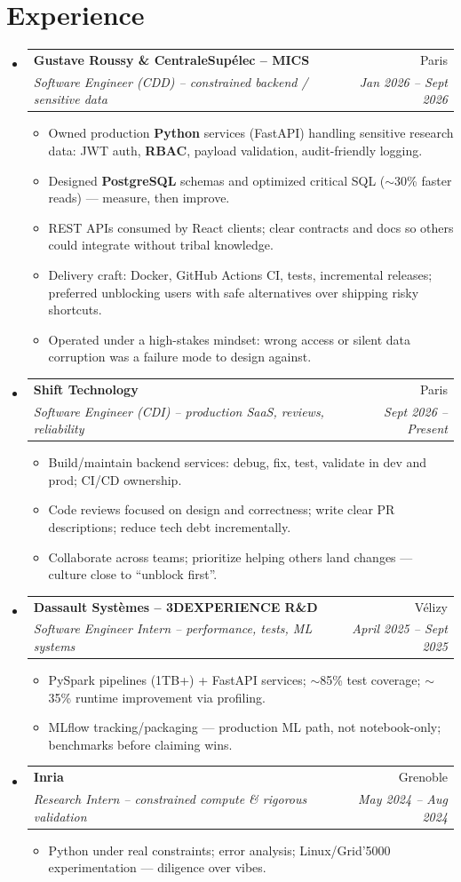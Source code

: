 \documentclass[letterpaper,10.5pt]{article}
\makeatletter
\newcommand{\resumeItem}[1]{\item\small{#1}}
\newcommand{\resumeSubheading}[4]{\vspace{2.5pt}\item\begin{tabular*}{0.97\textwidth}[t]{l@{\extracolsep{\fill}}r}\textbf{#1}&{#2}\\\textit{\small #3}&\textit{\small #4}\\\end{tabular*}\vspace{1pt}}
\newcommand{\resumeSubHeadingListStart}{\begin{itemize}[leftmargin=0.08in,label={}]}
\newcommand{\resumeSubHeadingListEnd}{\end{itemize}}
\makeatother
\begin{document}
\section{Experience}
\resumeSubHeadingListStart
  \resumeSubheading
    {Gustave Roussy \& CentraleSup\'elec -- MICS}{Paris}
    {Software Engineer (CDD) -- constrained backend / sensitive data}{Jan 2026 -- Sept 2026}
    \begin{itemize}
      \resumeItem{Owned production \textbf{Python} services (FastAPI) handling sensitive research data: JWT auth, \textbf{RBAC}, payload validation, audit-friendly logging.}
      \resumeItem{Designed \textbf{PostgreSQL} schemas and optimized critical SQL ($\sim$30\% faster reads) --- measure, then improve.}
      \resumeItem{REST APIs consumed by React clients; clear contracts and docs so others could integrate without tribal knowledge.}
      \resumeItem{Delivery craft: Docker, GitHub Actions CI, tests, incremental releases; preferred unblocking users with safe alternatives over shipping risky shortcuts.}
      \resumeItem{Operated under a high-stakes mindset: wrong access or silent data corruption was a failure mode to design against.}
    \end{itemize}
  \resumeSubheading
    {Shift Technology}{Paris}
    {Software Engineer (CDI) -- production SaaS, reviews, reliability}{Sept 2026 -- Present}
    \begin{itemize}
      \resumeItem{Build/maintain backend services: debug, fix, test, validate in dev and prod; CI/CD ownership.}
      \resumeItem{Code reviews focused on design and correctness; write clear PR descriptions; reduce tech debt incrementally.}
      \resumeItem{Collaborate across teams; prioritize helping others land changes --- culture close to ``unblock first''.}
    \end{itemize}
  \resumeSubheading
    {Dassault Syst\`emes -- 3DEXPERIENCE R\&D}{V\'elizy}
    {Software Engineer Intern -- performance, tests, ML systems}{April 2025 -- Sept 2025}
    \begin{itemize}
      \resumeItem{PySpark pipelines (1TB+) + FastAPI services; $\sim$85\% test coverage; $\sim$35\% runtime improvement via profiling.}
      \resumeItem{MLflow tracking/packaging --- production ML path, not notebook-only; benchmarks before claiming wins.}
    \end{itemize}
  \resumeSubheading
    {Inria}{Grenoble}
    {Research Intern -- constrained compute \& rigorous validation}{May 2024 -- Aug 2024}
    \begin{itemize}
      \resumeItem{Python under real constraints; error analysis; Linux/Grid'5000 experimentation --- diligence over vibes.}
    \end{itemize}
\resumeSubHeadingListEnd
\end{document}
